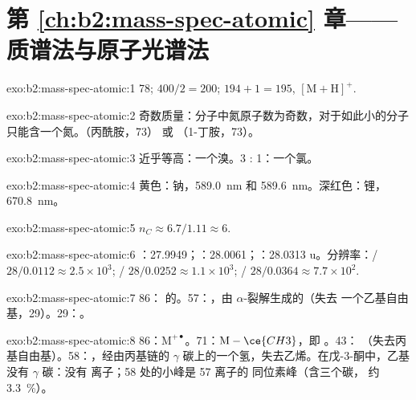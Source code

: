 \section*{第 \ref{ch:b2:mass-spec-atomic} 章——质谱法与原子光谱法}

\begin{solution}{exo:b2:mass-spec-atomic:1}
78; $400/2 = 200$; $194 + 1 = 195$, $[\mathrm M + \mathrm H]^+$.
\end{solution}

\begin{solution}{exo:b2:mass-spec-atomic:2}
奇数质量：分子中氮原子数为奇数，对于如此小的分子只能含一个氮。（丙酰胺，73）
或 （1-丁胺，73）。
\end{solution}

\begin{solution}{exo:b2:mass-spec-atomic:3}
近乎等高：一个溴。3 : 1：一个氯。
\end{solution}

\begin{solution}{exo:b2:mass-spec-atomic:4}
黄色：钠，\qty{589.0}{nm} 和 \qty{589.6}{nm}。深红色：锂，\qty{670.8}{nm}。
\end{solution}

\begin{solution}{exo:b2:mass-spec-atomic:5}
$n_C \approx 6.7/1.11 \approx 6$.
\end{solution}

\begin{solution}{exo:b2:mass-spec-atomic:6}
：27.9949；：28.0061；：28.0313 u。分辨率：/ $28/0.0112
\approx 2.5 \times 10^3$; / $28/0.0252 \approx 1.1 \times 10^3$; /
$28/0.0364 \approx 7.7 \times 10^2$.
\end{solution}

\begin{solution}{exo:b2:mass-spec-atomic:7}
86： 的。57：，由 $\alpha$-裂解生成的（失去
一个乙基自由基，29）。29：。
\end{solution}

\begin{solution}{exo:b2:mass-spec-atomic:8}
86：$\mathrm M^{+\bullet}$。71：$\mathrm M - \ce{CH3}$，即 。43：
（失去丙基自由基）。58：，经由丙基链的
$\gamma$ 碳上的一个氢，失去乙烯。在戊-3-酮中，乙基没有 $\gamma$ 碳：没有
离子；58 处的小峰是 57 离子的  同位素峰（含三个碳，
约 3.3~\%）。
\end{solution}

